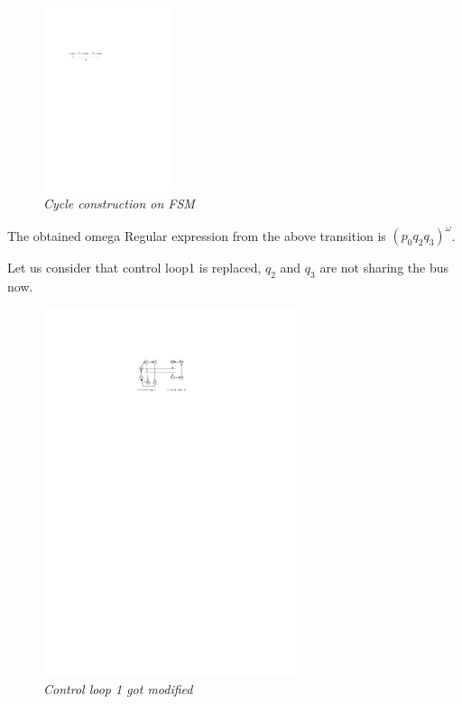 \begin{figure}[h]
\begin{center}
\includegraphics[width=1.5in]{cycle_1.pdf}
\end{center}
\vspace{-0.1in}
\caption{{\em Cycle construction on FSM }}
\label{fig:automaton}
\end{figure}


The obtained omega Regular expression from the above transition is $(p_0q_2q_3)^\omega$.

Let us consider that control loop1 is replaced, $q_2$ and $q_3$ are not sharing the bus now.

\begin{figure}[h]
\begin{center}
\includegraphics[width=3.0in]{diagram_replaced.pdf}
\end{center}
\vspace{-0.1in}
\caption{{\em Control loop 1 got modified }}
\label{fig:automaton}
\end{figure}

